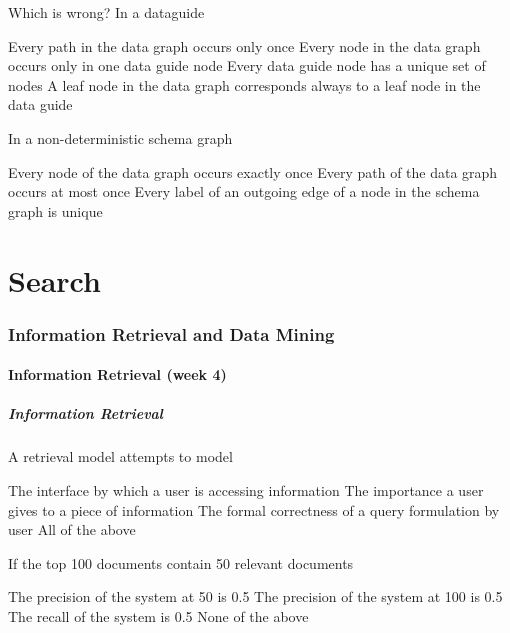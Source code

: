 \documentclass[12pt,a4paper,answers]{exam} %
\begin{document}
\begin{flushleft}
\begin{multicols*}{2}
\begin{questions}
\question Which is wrong? In a dataguide
\begin{checkboxes}
\choice Every path in the data graph occurs only once
\CorrectChoice Every node in the data graph occurs only in one data guide node
\choice Every data guide node has a unique set of nodes
\choice A leaf node in the data graph corresponds always to a leaf node in the data guide
\end{checkboxes}

\question In a non-deterministic schema graph
\begin{checkboxes}
\CorrectChoice Every node of the data graph occurs exactly once
\choice Every path of the data graph occurs at most once
\choice Every label of an outgoing edge of a node in the schema graph is unique
\end{checkboxes}


\part{Search}
\section{Information Retrieval and Data Mining}
\subsection{Information Retrieval (week 4)} %
\subsubsection{Information Retrieval}
\question A retrieval model attempts to model
\begin{checkboxes}
\choice The interface by which a user is accessing information
\CorrectChoice The importance a user gives to a piece of information
\choice The formal correctness of a query formulation by user
\choice All of the above
\end{checkboxes}

\question If the top 100 documents contain 50 relevant documents
\begin{checkboxes}
\choice The precision of the system at 50 is 0.5
\CorrectChoice The precision of the system at 100 is 0.5
\choice The recall of the system is 0.5
\choice None of the above
\end{checkboxes}


\end{questions}
\end{multicols*}
\end{flushleft}
\end{document}
